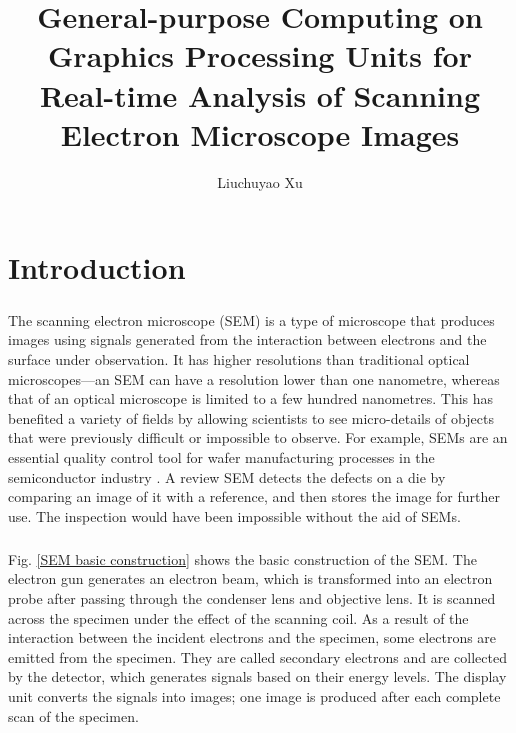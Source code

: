 \documentclass[12pt, twocolumn]{report}
\author{Liuchuyao Xu}
\title{General-purpose Computing on Graphics Processing Units for Real-time Analysis of Scanning Electron Microscope Images}
\begin{document}
\maketitle
\tableofcontents

\begin{abstract}
\end{abstract}

\chapter{Introduction}
\paragraph{}
The scanning electron microscope (SEM) is a type of microscope that produces images using signals generated from the interaction between electrons and the surface under observation. It has higher resolutions than traditional optical microscopes---an SEM can have a resolution lower than one nanometre, whereas that of an optical microscope is limited to a few hundred nanometres. This has benefited a variety of fields by allowing scientists to see micro-details of objects that were previously difficult or impossible to observe. For example, SEMs are an essential quality control tool for wafer manufacturing processes in the semiconductor industry \cite{SEM for semiconductor inspection}. A review SEM detects the defects on a die by comparing an image of it with a reference, and then stores the image for further use. The inspection would have been impossible without the aid of SEMs.

\paragraph{}
Fig. \ref{SEM basic construction} shows the basic construction of the SEM. The electron gun generates an electron beam, which is transformed into an electron probe after passing through the condenser lens and objective lens. It is scanned across the specimen under the effect of the scanning coil. As a result of the interaction between the incident electrons and the specimen, some electrons are emitted from the specimen. They are called secondary electrons and are collected by the detector, which generates signals based on their energy levels. The display unit converts the signals into images; one image is produced after each complete scan of the specimen.
\end{document}
